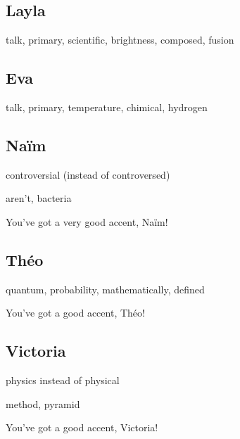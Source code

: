 \documentclass[12pt,oneside]{report}
\begin{document}
\begin{spacing}{1.2}
\subsection*{Layla}

talk, primary, scientific, brightness, composed, fusion

\subsection*{Eva}

talk, primary, temperature, chimical, hydrogen

\subsection*{Naïm}

controversial (instead of controversed)

aren't, bacteria

You've got a very good accent, Naïm!


\subsection*{Théo}


quantum, probability, mathematically, defined

You've got a good accent, Théo!


\subsection*{Victoria}

physics instead of physical

method, pyramid

You've got a good accent, Victoria!

\end{spacing}
\end{document}
